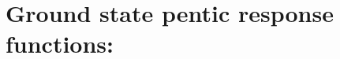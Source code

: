 
\section{Ground state pentic response functions: }\label{sec:cc5r}

\begin{description}
\item[] 
\item[] 
\item[] 
\item[] 
\item[] 
\item[] 
%
\end{description}
